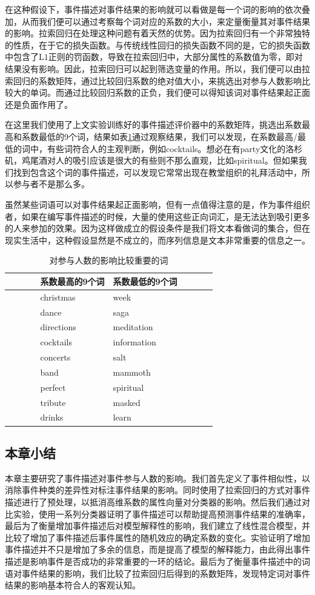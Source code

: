 \documentclass[12pt]{template}
\begin{document}
在这种假设下，事件描述对事件结果的影响就可以看做是每一个词的影响的依次叠加，从而我们便可以通过考察每个词对应的系数的大小，来定量衡量其对事件结果的影响。拉索回归在处理这种问题有着天然的优势。因为拉索回归有一个非常独特的性质，在于它的损失函数。与传统线性回归的损失函数不同的是，它的损失函数中包含了$\mathrm{L1}$正则的罚函数，导致在拉索回归中，大部分属性的系数值为零，即对结果没有影响。因此，拉索回归可以起到筛选变量的作用\citep{tibshirani_regression_1996}。所以，我们便可以由拉索回归的系数矩阵，通过比较回归系数的绝对值大小，来挑选出对参与人数影响比较大的单词。而通过比较回归系数的正负，我们便可以得知该词对事件结果起正面还是负面作用了\citep{noauthor_predicting_nodate}。

在这里我们使用了上文实验训练好的事件描述评价器中的系数矩阵，挑选出系数最高和系数最低的9个词，结果如表\ref{t1-2}通过观察结果，我们可以发现，在系数最高/最低的词中，有些词符合人的主观判断，例如cocktails。想必在有party文化的洛杉矶，鸡尾酒对人的吸引应该是很大的有些则不那么直观，比如spiritual。但如果我们找到包含这个词的事件描述，可以发现它常常出现在教堂组织的礼拜活动中，所以参与者不是那么多。

虽然某些词语可以对事件结果起正面影响，但有一点值得注意的是，作为事件组织者，如果在编写事件描述的时候，大量的使用这些正向词汇，是无法达到吸引更多的人来参加的效果。因为这样做成立的假设条件是我们将文本看做词的集合，但在现实生活中，这种假设显然是不成立的，而序列信息是文本非常重要的信息之一。

\begin{table}[htbp]
  \caption{\label{t1-2}对参与人数的影响比较重要的词}
    \centering
      \begin{tabular*}{\linewidth}{p{0.15\linewidth}p{0.35\linewidth}p{0.35\linewidth}p{0.15\linewidth}}
  \toprule      
      &系数最高的9个词 & 系数最低的9个词&\tabularnewline
  \midrule
  &christmas & week&\tabularnewline
  &dance & saga&\tabularnewline
  &directions & meditation&\tabularnewline
  &cocktails & information&\tabularnewline
  &concerts & salt&\tabularnewline
  &band & mammoth&\tabularnewline
  &perfect & spiritual&\tabularnewline
  &tribute & masked&\tabularnewline
  &drinks & learn&\tabularnewline
  \bottomrule
      \end{tabular*}
  \end{table}

\subsection{本章小结}
本章主要研究了事件描述对事件参与人数的影响。我们首先定义了事件相似性，以消除事件种类的差异性对标注事件结果的影响。同时使用了拉索回归的方式对事件描述进行了预处理，以抵消高维系数的属性向量对分类器的影响。然后我们通过对比实验，使用一系列分类器证明了事件描述可以帮助提高预测事件结果的准确率，最后为了衡量增加事件描述后对模型解释性的影响，我们建立了线性混合模型，并比较了增加了事件描述后事件属性的随机效应的确定系数的变化。实验证明了增加事件描述并不只是增加了多余的信息，而是提高了模型的解释能力，由此得出事件描述是影响事件是否成功的非常重要的一环的结论。最后为了衡量事件描述中的词语对事件结果的影响，我们比较了拉索回归后得到的系数矩阵，发现特定词对事件结果的影响基本符合人的客观认知。
\end{document}

